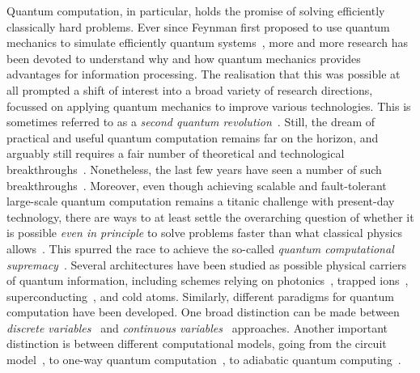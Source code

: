 Quantum computation, in particular, holds the promise of solving efficiently classically hard problems.
Ever since Feynman first proposed to use quantum mechanics to simulate efficiently quantum systems~\cite{feynman1982simulating}, more and more research has been devoted to understand why and how quantum mechanics provides advantages for information processing.
The realisation that this was possible at all prompted a shift of interest into a broad variety of research directions, focussed on applying quantum mechanics to improve various technologies. This is sometimes referred to as a \textit{second quantum revolution}~\cite{dowling2003quantum}.
Still, the dream of practical and useful quantum computation remains far on the horizon, and arguably still requires a fair number of theoretical and technological breakthroughs~\cite{preskill2018quantum,flamini2018photonic,wang2019integrated}.
Nonetheless, the last few years have seen a number of such breakthroughs~\cite{fowler2012surface,barends2014superconducting,córcoles2015demonstration,ofek2016extending,arute2019quantum}.
Moreover, even though achieving scalable and fault-tolerant large-scale quantum computation remains a titanic challenge with present-day technology, there are ways to at least settle the overarching question of whether it is possible \textit{even in principle} to solve problems faster than what classical physics allows~\cite{aaronson2011computational,bremner2016average,boixo2018characterizing,aaronson2017complexity,neill2018blueprint}. This spurred the race to achieve the so-called \textit{quantum computational supremacy}~\cite{broome2012photonic,spring2012boson,crespi2013integrated,tillmann2013experimental,bentivegna2015experimental,zhong201812photon,zhong2019experimental,wang2019boson,bouland2018complexity,arute2019quantum}.
Several architectures have been studied as possible physical carriers of quantum information, including schemes relying on photonics~\cite{wang2019integrated,flamini2018photonic}, trapped ions~\cite{bruzewicz2019trappedion,lekitsch2017blueprint}, superconducting~\cite{krantz2019quantum,you2011atomic}, and cold atoms.
Similarly, different paradigms for quantum computation have been developed. One broad distinction can be made between \textit{discrete variables}~\cite{walmsley2005applied,andersen2015hybrid} and \textit{continuous variables}~\cite{lloyd1999quantum,braunstein2005quantum} approaches.
Another important distinction is between different computational models, going from the circuit model~\cite{nielsen2006quantum}, to one-way quantum computation~\cite{raussendorf2001one,walther2005experimental,browne2006one}, to adiabatic quantum computing~\cite{aharonov2004adiabatic,albash2018adiabatic}.


